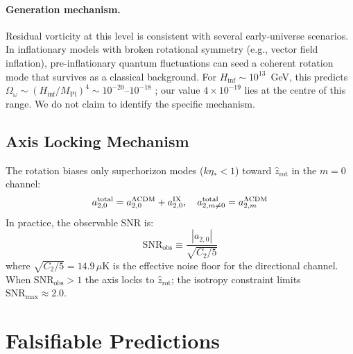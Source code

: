 \documentclass[12pt]{article}
\begin{document}
\paragraph{Generation mechanism.}
Residual vorticity at this level is consistent with several early-universe scenarios.
In inflationary models with broken rotational symmetry (e.g., vector field inflation),
pre-inflationary quantum fluctuations can seed a coherent rotation mode that survives
as a classical background.
For $H_\mathrm{inf}\sim10^{13}$~GeV, this predicts
$\Omega_\omega\sim(H_\mathrm{inf}/M_\mathrm{Pl})^4\sim10^{-20}$--$10^{-18}$
\citep{Pontzen2009}; our value $4\times10^{-19}$ lies at the centre of this range.
We do not claim to identify the specific mechanism.

\subsection{Axis Locking Mechanism}

The rotation biases only superhorizon modes ($k\eta_*<1$) toward $\hat{z}_\mathrm{rot}$
in the $m=0$ channel:
\begin{equation}
  a^{\rm total}_{2,0} = a^{\Lambda\mathrm{CDM}}_{2,0} + a^{\rm IX}_{2,0},\quad
  a^{\rm total}_{2,m\neq0} = a^{\Lambda\mathrm{CDM}}_{2,m}
\end{equation}
In practice, the observable SNR is:
\begin{equation}
  \mathrm{SNR}_\mathrm{obs} \equiv \frac{|a_{2,0}|}{\sqrt{C_2/5}}
\end{equation}
where $\sqrt{C_2/5}=14.9\,\mu$K is the effective noise floor for the directional
channel. When $\mathrm{SNR}_\mathrm{obs}>1$ the axis locks to $\hat{z}_\mathrm{rot}$;
the isotropy constraint limits $\mathrm{SNR}_{\max}\approx2.0$.

\section{Falsifiable Predictions}

\end{document}
